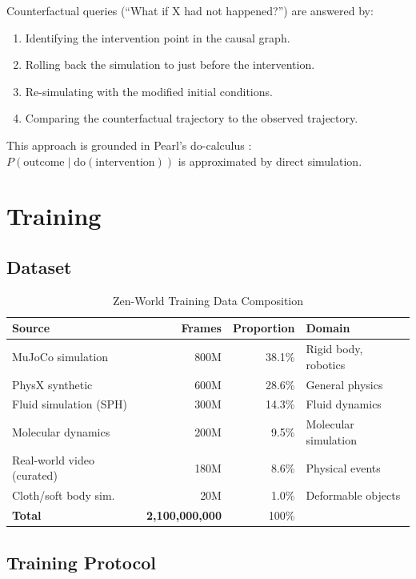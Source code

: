 \documentclass[11pt,a4paper]{article}
\begin{document}
Counterfactual queries (``What if X had not happened?'') are answered by:
\begin{enumerate}
    \item Identifying the intervention point in the causal graph.
    \item Rolling back the simulation to just before the intervention.
    \item Re-simulating with the modified initial conditions.
    \item Comparing the counterfactual trajectory to the observed trajectory.
\end{enumerate}

This approach is grounded in Pearl's do-calculus \cite{pearl2009causality}:
$P(\text{outcome} \mid \text{do}(\text{intervention}))$ is approximated by direct simulation.

\section{Training}

\subsection{Dataset}

\begin{table}[H]
\centering
\begin{tabular}{lrrl}
\toprule
\textbf{Source} & \textbf{Frames} & \textbf{Proportion} & \textbf{Domain} \\
\midrule
MuJoCo simulation & 800M & 38.1\% & Rigid body, robotics \\
PhysX synthetic & 600M & 28.6\% & General physics \\
Fluid simulation (SPH) & 300M & 14.3\% & Fluid dynamics \\
Molecular dynamics & 200M & 9.5\% & Molecular simulation \\
Real-world video (curated) & 180M & 8.6\% & Physical events \\
Cloth/soft body sim. & 20M & 1.0\% & Deformable objects \\
\midrule
\textbf{Total} & \textbf{2,100,000,000} & 100\% & \\
\bottomrule
\end{tabular}
\caption{Zen-World Training Data Composition}
\end{table}

\subsection{Training Protocol}
\end{document}
